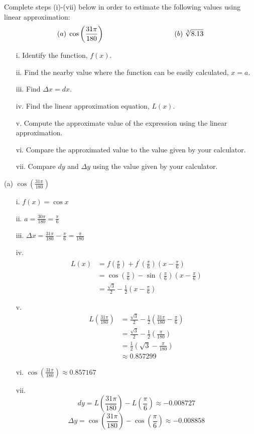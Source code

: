\documentclass[nooutcomes]{ximera}
\begin{document}
\begin{problem}
Complete steps (i)-(vii) below in order to estimate the following values using linear approximation:
$$ (a) \; \cos \left( \frac{31 \pi}{180} \right)	\hskip 100pt	(b) \; \sqrt[3]{8.13} $$
	\begin{enumerate}
	\item[i.]  Identify the function, $f(x)$.
	\item[ii.]  Find the nearby value where the function can be easily calculated, $x=a$.
	\item[iii.]  Find $\Delta x=dx$.
	\item[iv.]  Find the linear approximation equation, $L(x)$.  
	\item[v.]  Compute the approximate value of the expression using the linear approximation.
	\item[vi.]  Compare the approximated value to the value given by your calculator.
	\item[vii.]  Compare $dy$ and $\Delta y$ using the value given by your calculator.
	\end{enumerate}
		\begin{freeResponse}
		(a)  $ \cos \left( \frac{31 \pi}{180} \right)$
			\begin{enumerate}
			\item[i.]  $f(x) = \cos x$
			\item[ii.]  $a = \frac{30 \pi}{180} = \frac{\pi}{6}$
			\item[iii.]  $\Delta x = \frac{31 \pi}{180} - \frac{\pi}{6} = \frac{\pi}{180}$
			\item[iv.]  
				\begin{align*}
				L(x) &= f\left( \frac{\pi}{6} \right) + f^\prime \left(\frac{\pi}{6} \right) \left( x - \frac{\pi}{6} \right) \\
				&=  \cos \left( \frac{\pi}{6} \right) - \sin \left(\frac{\pi}{6} \right) \left( x - \frac{\pi}{6} \right) \\
				&=  \frac{\sqrt{3}}{2} - \frac{1}{2} \left( x - \frac{\pi}{6} \right) 
				\end{align*}
			\item[v.]   
				\begin{align*}
				L \left( \frac{31 \pi}{180} \right) &= \frac{\sqrt{3}}{2} - \frac{1}{2} \left( \frac{31 \pi}{180} - \frac{\pi}{6} \right) \\
				&=  \frac{\sqrt{3}}{2} - \frac{1}{2} \left( \frac{\pi}{180} \right) \\
				&= \frac{1}{2} \left( \sqrt{3} - \frac{\pi}{180} \right) \\
				&\approx 0.857299
				\end{align*}
			\item[vi.]  $\cos \left( \frac{31 \pi}{180} \right) \approx 0.857167$
			\item[vii.]  
			$$ dy = L\left( \frac{31\pi}{180} \right) - L \left( \frac{\pi}{6} \right) \approx -0.008727 $$
			$$ \Delta y = \cos \left( \frac{31 \pi}{180} \right) - \cos \left( \frac{\pi}{6} \right) \approx -0.008858 $$
			\end{enumerate}
			

\end{freeResponse}
\end{problem}
\end{document}
